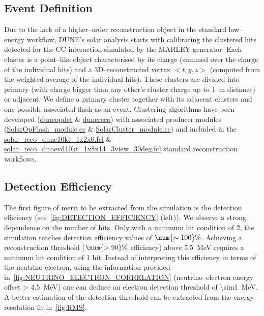 \subsection{Event Definition}\label{sec:EVENT_DEFINITION}
Due to the lack of a higher--order reconstruction object in the standard low--energy workflow, \ac{DUNE}'s solar analysis starts with calibrating the clustered hits detected for the \ac{CC} interaction simulated by the MARLEY generator. Each cluster is a point--like object characterised by its charge (summed over the charge of the individual hits) and a 3D--reconstructed vertex $<t, y, z>$ (computed from the weighted average of the individual hits). These clusters are divided into primary (with charge bigger than any other's cluster charge up to \SI{1}{\meter} distance) or adjacent. We define a primary cluster together with its adjacent clusters and one possible associated flash as an event. Clustering algorithms have been developed (\href{https://github.com/DUNE/duneopdet/tree/develop/duneopdet/SolarNuUtils}{duneopdet} \& \href{https://github.com/DUNE/dunereco/tree/develop/dunereco/LowEUtils}{dunereco}) with associated producer modules (\href{https://github.com/DUNE/duneopdet/blob/develop/duneopdet/OpticalDetector/SolarOpFlash_module.cc}{SolarOpFlash\_module.cc} \& \href{https://github.com/DUNE/dunereco/blob/develop/dunereco/LowEUtils/SolarCluster_module.cc}{SolarCluster\_module.cc}) and included in the \href{https://github.com/DUNE/dunesw/blob/develop/fcl/dunefd/reco/solar_reco_dune10kt_1x2x6.fcl}{solar\_reco\_dune10kt\_1x2x6.fcl} \& \href{https://github.com/DUNE/dunesw/blob/develop/fcl/dunefdvd/reco/solar_reco_dunevd10kt_1x8x14_3view_30deg.fcl}{solar\_reco\_dunevd10kt\_1x8x14\_3view\_30deg.fcl} standard reconstruction workflows.

\subsection{Detection Efficiency}\label{sec:DETECTION_EFFICIENCY}
The first figure of merit to be extracted from the simulation is the detection efficiency (see~\cref{fig:DETECTION_EFFICIENCY} (left)). We observe a strong dependence on the number of hits. Only with a minimum hit condition of 2, the simulation reaches detection efficiency values of $\num{\sim 100}\%$. Achieving a reconstruction threshold ($\num{> 90}\%$ efficiency) above \SI{5.5}{\mega\electronvolt} requires a minimum hit condition of 1 hit. Instead of interpreting this efficiency in terms of the neutrino electron, using the information provided in~\cref{fig:NEUTRINO_ELECTRON_CORRELATION} (neutrino--electron energy offset \SI{> 4.5}{\mega\electronvolt}) one can deduce an electron detection threshold of \SI{\sim1}{\mega\electronvolt}. A better estimation of the detection threshold can be extracted from the energy resolution fit in~\cref{fig:RMS}.

